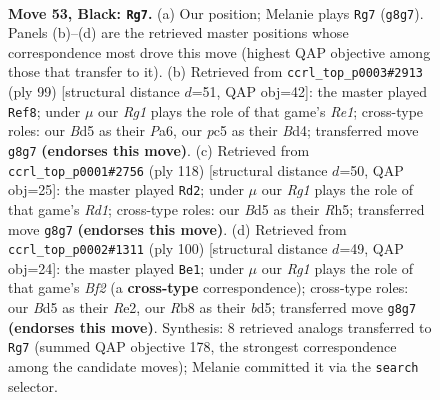 \documentclass[11pt]{article}
\begin{document}
\clearpage

\begin{figure}[p]\centering
\begin{subfigure}{0.46\textwidth}\centering
\resizebox{\linewidth}{!}{%
\newchessgame
\chessboard[
  setfen={1r1k2r1/p1p5/P1p3p1/2Pb1p1p/RP3P1P/6R1/5K2/1N6 b - - 29 53},
  showmover=false,
  pgfstyle=straightmove, color=movearrow, markmove={g8-g7}
]}
\caption{}
\end{subfigure}\hfill
\begin{subfigure}{0.46\textwidth}\centering
\resizebox{\linewidth}{!}{%
\newchessgame
\chessboard[
  setfen={4r3/2pk4/p4rp1/P1p1p2p/2Pb3P/1P3PP1/4RNK1/1R6 b - - 32 50},
  showmover=false,
  pgfstyle=straightmove, color=movearrow, markmove={e8-f8}
]}
\caption{}
\end{subfigure}
\\[4pt]
\begin{subfigure}{0.46\textwidth}\centering
\resizebox{\linewidth}{!}{%
\newchessgame
\chessboard[
  setfen={4k3/2p2r2/1p1p4/pP5R/P1PPr1p1/6P1/5P2/3R1K2 w - - 1 60},
  showmover=false,
  pgfstyle=straightmove, color=movearrow, markmove={d1-d2}
]}
\caption{}
\end{subfigure}\hfill
\begin{subfigure}{0.46\textwidth}\centering
\resizebox{\linewidth}{!}{%
\newchessgame
\chessboard[
  setfen={8/3k2p1/5p1p/3b3P/pprP3K/P4P2/1P2RBP1/8 w - - 0 51},
  showmover=false,
  pgfstyle=straightmove, color=movearrow, markmove={f2-e1}
]}
\caption{}
\end{subfigure}
\caption{\textbf{Move 53, Black: \texttt{Rg7}.} (a) Our position; Melanie plays \texttt{Rg7} (\texttt{g8g7}). Panels (b)--(d) are the retrieved master positions whose correspondence most drove this move (highest QAP objective among those that transfer to it). (b) Retrieved from \texttt{ccrl\_top\_p0003\#2913} (ply 99) [structural distance $d$=51, QAP obj=42]: the master played \texttt{Ref8}; under $\mu$ our \emph{Rg1} plays the role of that game's \emph{Re1}; cross-type roles: our \emph{B}d5 as their \emph{P}a6, our \emph{p}c5 as their \emph{B}d4; transferred move \texttt{g8g7} \textbf{(endorses this move)}. (c) Retrieved from \texttt{ccrl\_top\_p0001\#2756} (ply 118) [structural distance $d$=50, QAP obj=25]: the master played \texttt{Rd2}; under $\mu$ our \emph{Rg1} plays the role of that game's \emph{Rd1}; cross-type roles: our \emph{B}d5 as their \emph{R}h5; transferred move \texttt{g8g7} \textbf{(endorses this move)}. (d) Retrieved from \texttt{ccrl\_top\_p0002\#1311} (ply 100) [structural distance $d$=49, QAP obj=24]: the master played \texttt{Be1}; under $\mu$ our \emph{Rg1} plays the role of that game's \emph{Bf2} (a \textbf{cross-type} correspondence); cross-type roles: our \emph{B}d5 as their \emph{R}e2, our \emph{R}b8 as their \emph{b}d5; transferred move \texttt{g8g7} \textbf{(endorses this move)}. Synthesis: 8 retrieved analogs transferred to \texttt{Rg7} (summed QAP objective 178, the strongest correspondence among the candidate moves); Melanie committed it via the \texttt{search} selector.}
\label{fig:thought-m105}
\end{figure}
\end{document}

